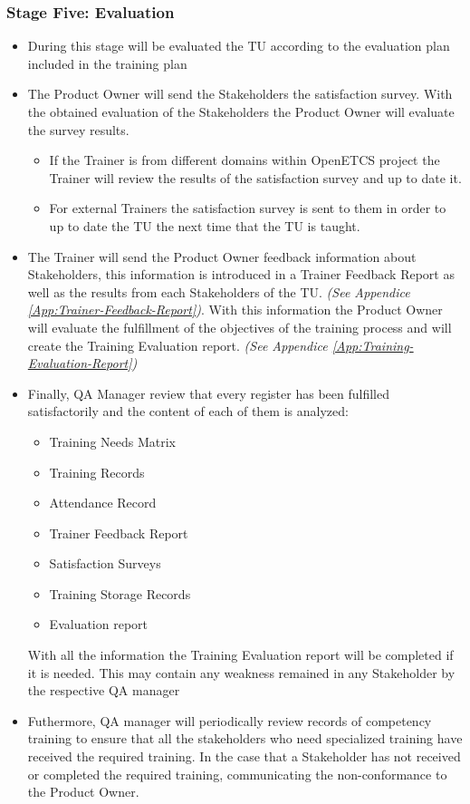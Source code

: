 \documentclass{template/openetcs_article}
\begin{document}
\subsubsection{Stage Five: Evaluation}
\begin{itemize}
\item During this stage will be evaluated the TU according to the evaluation plan included in the training plan
\item The Product Owner will send the Stakeholders the satisfaction survey. With the obtained evaluation of the Stakeholders the Product Owner will evaluate the survey results.
\begin{itemize}
\item If the Trainer is from different domains within OpenETCS project the Trainer will review the results of the satisfaction survey and up to date it.
\item For external Trainers the satisfaction survey is sent to them in order to up to date the TU the next time that the TU is taught.  
\end{itemize}
\item The Trainer will send the Product Owner feedback information about Stakeholders, this information is introduced in a Trainer Feedback Report as well as the results from each Stakeholders of the TU. {\it {(See Appendice \ref{App:Trainer-Feedback-Report})}}. With this information the Product Owner will evaluate the fulfillment of the objectives of the training process and will create the Training Evaluation report. {\it {(See Appendice \ref{App:Training-Evaluation-Report})}}
\item Finally, QA Manager review that every register has been fulfilled satisfactorily and the content of each of them is analyzed:
\begin{itemize}
\item Training Needs Matrix
\item Training Records
\item Attendance Record
\item Trainer Feedback Report
\item Satisfaction Surveys
\item Training Storage Records
\item Evaluation report
\end{itemize}
With all the information the Training Evaluation report will be completed if it is needed. This may contain any weakness remained in any Stakeholder by the respective QA manager
\item Futhermore, QA manager will periodically review records of competency training to ensure that all the stakeholders who need specialized training have received the required training. In the case that a Stakeholder has not received or completed the required training, communicating the non-conformance to the Product Owner. 
\end{itemize}
\end{document}

